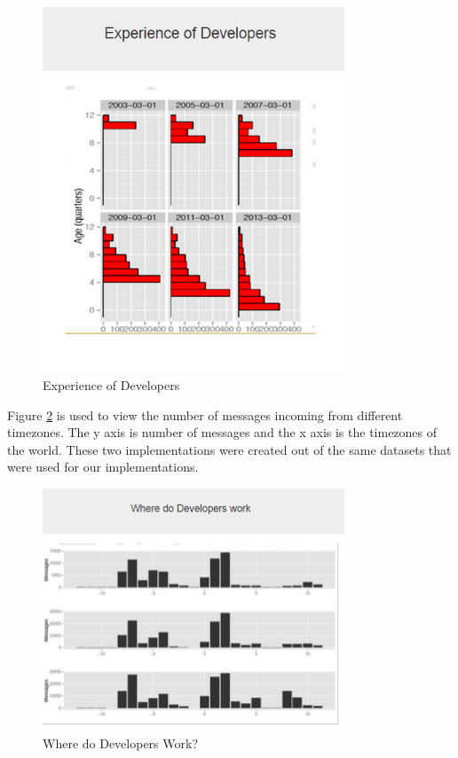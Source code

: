 \documentclass[seploa]{beavtex}
\begin{document}
\begin{figure}[H]
\begin{center}
\includegraphics[width=90mm]{image11.PNG}
\end{center}
\caption{Experience of Developers}
\label{fig:devExp}
\end{figure}

Figure \ref{fig:devWork} is used to view the number of messages incoming from different timezones. The y axis is number of messages and the x axis is the timezones of the world. These two implementations were created out of the same datasets that were used for our implementations.

\begin{figure}[H]
\begin{center}
\includegraphics[width=90mm]{image12.PNG}
\end{center}
\caption{Where do Developers Work?}
\label{fig:devWork}
\end{figure}
\end{document}
